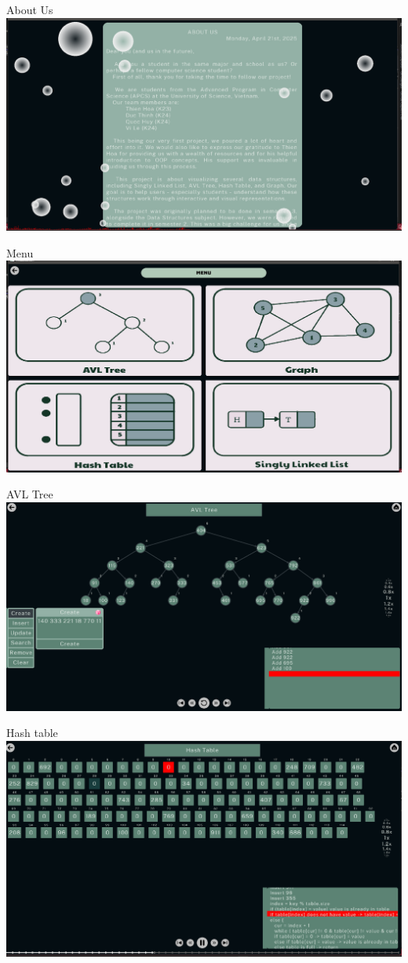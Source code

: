 \begin{center}
    About Us     \includegraphics[scale=.35]{img/aboutus.png} 
    
    Menu \includegraphics[scale=.35]{img/menu.png}
    
    AVL Tree \includegraphics[scale=.35]{img/avl.png} 
    
    Hash table \includegraphics[scale=.35]{img/hashtable.png}
    

\end{center}
